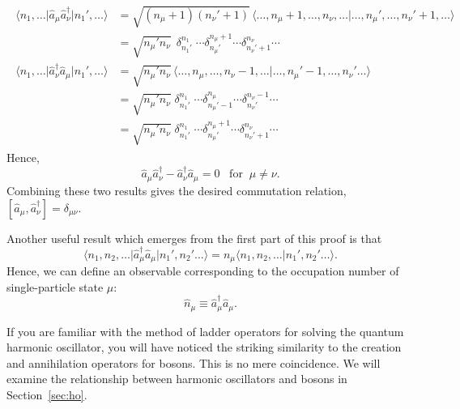 \documentclass[prx,12pt]{revtex4-2}
\begin{document}
\begin{align*}
  \begin{aligned}\big\langle n_1, \dots \big| \hat{a}_\mu \hat{a}_\nu^\dagger \big| n_1', \dots\big\rangle &= \sqrt{(n_\mu+1)(n_\nu'+1)}\, \langle \dots, n_\mu+1, \dots, n_\nu, \dots | \dots, n_\mu', \dots, n_\nu'+1, \dots\rangle \\ &= \sqrt{n_\mu' n_\nu} \;\, \delta^{n_1}_{n_1'} \; \cdots \delta^{n_\mu+1}_{n_\mu'} \cdots \delta^{n_\nu}_{n_\nu' + 1}\cdots \\ \big\langle n_1, \dots \big| \hat{a}_\nu^\dagger \hat{a}_\mu \big| n_1', \dots\big\rangle &= \sqrt{n_\mu' n_\nu}\, \langle \dots, n_\mu, \dots,n_\nu-1,\dots | \dots, n_\mu'-1, \dots, n_\nu'\dots\rangle \\&= \sqrt{n_\mu' n_\nu} \;\delta^{n_1}_{n_1'} \; \cdots \delta^{n_\mu}_{n_\mu'-1}\cdots \delta^{n_\nu-1}_{n_\nu'} \cdots \\ &= \sqrt{n_\mu' n_\nu} \; \delta^{n_1}_{n_1'} \; \cdots \delta^{n_\mu+1}_{n_\mu'}\cdots \delta^{n_\nu}_{n_\nu'+1} \cdots\end{aligned}
\end{align*}
Hence,
\begin{equation}
  \hat{a}_\mu \hat{a}_\nu^\dagger - \hat{a}_\nu^\dagger \hat{a}_\mu = 0 \;\;\;\mathrm{for}\;\;\mu\ne\nu.
\end{equation}
Combining these two results gives the desired commutation relation,
$[\hat{a}_\mu, \hat{a}_\nu^\dagger] = \delta_{\mu\nu}$.

Another useful result which emerges from the first part of this proof
is that
\begin{equation}
  \big\langle n_1, n_2, \dots \big| \hat{a}_\mu^\dagger \hat{a}_\mu \big| n_1', n_2'\dots\big\rangle = n_\mu \big\langle n_1, n_2, \dots \big| n_1', n_2'\dots\big\rangle.
\end{equation}
Hence, we can define an observable corresponding to the occupation
number of single-particle state $\mu$:
\begin{equation}
  \hat{n}_\mu \equiv \hat{a}_\mu^\dagger \hat{a}_\mu.
  \label{numberop}
\end{equation}

If you are familiar with the method of ladder operators for solving
the quantum harmonic oscillator, you will have noticed the striking
similarity to the creation and annihilation operators for bosons.
This is no mere coincidence.  We will examine the relationship between
harmonic oscillators and bosons in Section~\ref{sec:ho}.
\end{document}
